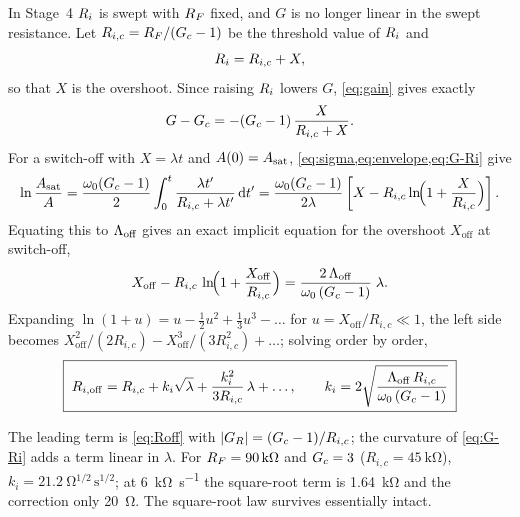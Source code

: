 In Stage~4 $R_{i}$ is swept with $R_{F}$ fixed, and $G$ is no longer linear in the swept resistance. Let
$R_{i,c}=R_{F}/(G_{c}-1)$ be the threshold value of $R_{i}$ and
\begin{equation}
  R_{i} = R_{i,c} + X ,
  \label{eq:X}
\end{equation}
so that $X$ is the overshoot. Since raising $R_{i}$ lowers $G$, \cref{eq:gain} gives exactly
\begin{equation}
  G - G_{c} = -(G_{c}-1)\,\frac{X}{R_{i,c}+X} .
  \label{eq:G-Ri}
\end{equation}
For a switch-off with $X=\lambda t$ and $A(0)=A_{\mathrm{sat}}$, \cref{eq:sigma,eq:envelope,eq:G-Ri} give
\begin{equation}
  \ln\frac{A_{\mathrm{sat}}}{A}
  = \frac{\omega_{0}(G_{c}-1)}{2}\int_{0}^{t}\frac{\lambda t'}{R_{i,c}+\lambda t'}\,\mathrm{d} t'
  = \frac{\omega_{0}(G_{c}-1)}{2\lambda}\left[X - R_{i,c}\ln\!\Bigl(1+\frac{X}{R_{i,c}}\Bigr)\right] .
  \label{eq:Ri-integral}
\end{equation}
Equating this to $\Lambda_{\mathrm{off}}$ gives an exact implicit equation for the overshoot $X_{\mathrm{off}}$ at
switch-off,
\begin{equation}
  X_{\mathrm{off}} - R_{i,c}\,\ln\!\Bigl(1+\frac{X_{\mathrm{off}}}{R_{i,c}}\Bigr)
  = \frac{2\,\Lambda_{\mathrm{off}}}{\omega_{0}\,(G_{c}-1)}\;\lambda .
  \label{eq:Ri-exact}
\end{equation}
Expanding $\ln(1+u)=u-\tfrac12u^{2}+\tfrac13u^{3}-\dots$ for $u=X_{\mathrm{off}}/R_{i,c}\ll 1$, the left
side becomes $X_{\mathrm{off}}^{2}/(2R_{i,c}) - X_{\mathrm{off}}^{3}/(3R_{i,c}^{2})+\dots$; solving order by
order,
\begin{equation}
  \boxed{\;R_{i,\mathrm{off}} = R_{i,c} + k_{i}\sqrt{\lambda} + \frac{k_{i}^{2}}{3R_{i,c}}\,\lambda + \dots,
  \qquad k_{i} = 2\sqrt{\frac{\Lambda_{\mathrm{off}}\,R_{i,c}}{\omega_{0}\,(G_{c}-1)}}\;}
  \label{eq:Ri-off}
\end{equation}

\begin{whybox}
The leading term is \cref{eq:Roff} with $|G_{R}|=(G_{c}-1)/R_{i,c}$; the curvature of \cref{eq:G-Ri} adds
a term linear in $\lambda$. For $R_{F}=\SI{90}{\kilo\ohm}$ and $G_{c}=3$ ($R_{i,c}=\SI{45}{\kilo\ohm}$),
$k_{i}=\SI{21.2}{\ohm^{1/2}\,\second^{1/2}}$; at \SI{6}{\kilo\ohm\per\second} the square-root term is
\SI{1.64}{\kilo\ohm} and the correction only \SI{20}{\ohm}. The square-root law survives essentially
intact.
\end{whybox}

